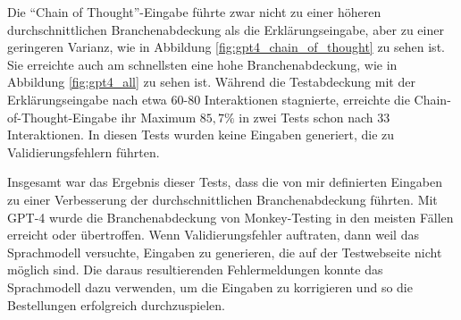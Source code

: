 Die \enquote{Chain of Thought}-Eingabe führte zwar nicht zu einer höheren durchschnittlichen Branchenabdeckung als die Erklärungseingabe, aber zu einer geringeren Varianz, wie in Abbildung \ref{fig:gpt4_chain_of_thought} zu sehen ist.
Sie erreichte auch am schnellsten eine hohe Branchenabdeckung, wie in Abbildung \ref{fig:gpt4_all} zu sehen ist.
Während die Testabdeckung mit der Erklärungseingabe nach etwa 60-80 Interaktionen stagnierte, erreichte die Chain-of-Thought-Eingabe ihr Maximum $85{,}7\%$ in zwei Tests schon nach 33 Interaktionen.
In diesen Tests wurden keine Eingaben generiert, die zu Validierungsfehlern führten.

Insgesamt war das Ergebnis dieser Tests, dass die von mir definierten Eingaben zu einer Verbesserung der durchschnittlichen Branchenabdeckung führten.
Mit GPT-4 wurde die Branchenabdeckung von Monkey-Testing in den meisten Fällen erreicht oder übertroffen.
Wenn Validierungsfehler auftraten, dann weil das Sprachmodell versuchte, Eingaben zu generieren, die auf der Testwebseite nicht möglich sind.
Die daraus resultierenden Fehlermeldungen konnte das Sprachmodell dazu verwenden, um die Eingaben zu korrigieren und so die Bestellungen erfolgreich durchzuspielen.
